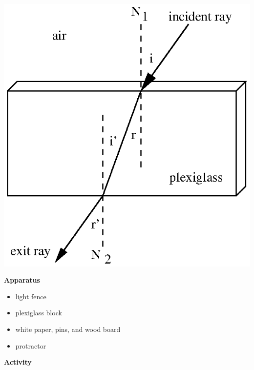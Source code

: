 \vspace{0.3cm}
{\centering \includegraphics{refraction_of_light/refraction_of_light_fig_1.eps} \par}
\vspace{0.3cm}

\vspace{15mm}
\textbf{Apparatus} 

\begin{itemize}
\item light fence 
\item plexiglass block 
\item white paper, pins, and wood board 
\item protractor
\end{itemize}
\textbf{Activity} 

